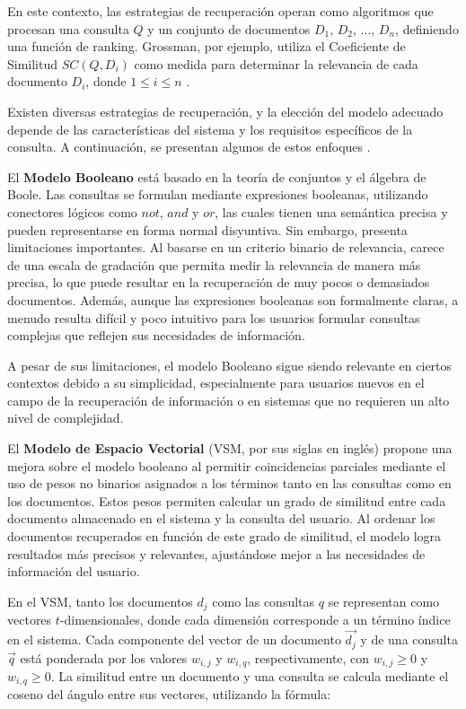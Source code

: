 En este contexto, las estrategias de recuperación operan como algoritmos que procesan una 
consulta $Q$ y un conjunto de documentos $D_{1}$, $D_{2}$, ..., $D_{n}$, 
definiendo una función de ranking. Grossman, por ejemplo, utiliza el Coeficiente de Similitud 
$SC(Q, D_{i})$ como medida para determinar la relevancia de cada documento $D_{i}$, donde 
$1 \leq i \leq n$ \cite{Grossman2004}.

Existen diversas estrategias de recuperación, y la elección del modelo adecuado 
depende de las características del sistema y los requisitos específicos de la consulta. 
A continuación, se presentan algunos de estos enfoques \cite{Baeza1999}.

El \textbf{Modelo Booleano} está basado en la teoría de conjuntos y el álgebra 
de Boole. Las consultas se formulan mediante expresiones booleanas, utilizando 
conectores lógicos como $not$, $and$ y $or$, las cuales tienen una semántica precisa 
y pueden representarse en forma normal disyuntiva. Sin embargo, presenta limitaciones 
importantes. Al basarse en un criterio binario de relevancia, carece de una escala 
de gradación que permita medir la relevancia de manera más precisa, lo que puede 
resultar en la recuperación de muy pocos o demasiados documentos. Además, aunque 
las expresiones booleanas son formalmente claras, a menudo resulta difícil y poco 
intuitivo para los usuarios formular consultas complejas que reflejen sus 
necesidades de información.

A pesar de sus limitaciones, el modelo Booleano sigue siendo relevante en ciertos 
contextos debido a su simplicidad, especialmente para usuarios nuevos en el campo 
de la recuperación de información o en sistemas que no requieren un alto nivel de complejidad.

El \textbf{Modelo de Espacio Vectorial} (VSM, por sus siglas en inglés) propone 
una mejora sobre el modelo booleano al permitir coincidencias parciales mediante 
el uso de pesos no binarios asignados a los términos tanto en las consultas como 
en los documentos. Estos pesos permiten calcular un grado de similitud entre cada 
documento almacenado en el sistema y la consulta del usuario. Al ordenar los documentos 
recuperados en función de este grado de similitud, el modelo logra resultados más precisos 
y relevantes, ajustándose mejor a las necesidades de información del usuario.

En el VSM, tanto los documentos \( d_j \) como las consultas \( q \) se representan 
como vectores \( t \)-dimensionales, donde cada dimensión corresponde a un término 
índice en el sistema. Cada componente del vector de un documento \( \vec{d_j} \) y de 
una consulta \( \vec{q} \) está ponderada por los valores \( w_{i,j} \) y \( w_{i,q} \), 
respectivamente, con \( w_{i,j} \geq 0 \) y \( w_{i,q} \geq 0 \). La similitud entre un 
documento y una consulta se calcula mediante el coseno del ángulo entre sus vectores, 
utilizando la fórmula:

